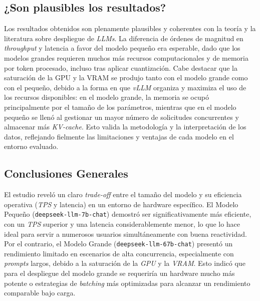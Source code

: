 \subsection*{¿Son plausibles los resultados?}
Los resultados obtenidos son plenamente plausibles y coherentes con la teoría y la literatura sobre despliegue de \textit{LLMs}. La diferencia de órdenes de magnitud en \textit{throughput} y latencia a favor del modelo pequeño era esperable, dado que los modelos grandes requieren muchos más recursos computacionales y de memoria por token procesado, incluso tras aplicar cuantización. Cabe destacar que la saturación de la GPU y la VRAM se produjo tanto con el modelo grande como con el pequeño, debido a la forma en que \textit{vLLM} organiza y maximiza el uso de los recursos disponibles: en el modelo grande, la memoria se ocupó principalmente por el tamaño de los parámetros, mientras que en el modelo pequeño se llenó al gestionar un mayor número de solicitudes concurrentes y almacenar más \textit{KV-cache}. Esto valida la metodología y la interpretación de los datos, reflejando fielmente las limitaciones y ventajas de cada modelo en el entorno evaluado.

\subsection*{Conclusiones Generales}
El estudio reveló un claro \textit{trade-off} entre el tamaño del modelo y su eficiencia operativa (\textit{TPS} y latencia) en un entorno de hardware específico. El Modelo Pequeño (\texttt{deepseek-llm-7b-chat}) demostró ser significativamente más eficiente, con un \textit{TPS} superior y una latencia considerablemente menor, lo que lo hace ideal para servir a numerosos usuarios simultáneamente con buena reactividad. Por el contrario, el Modelo Grande (\texttt{deepseek-llm-67b-chat}) presentó un rendimiento limitado en escenarios de alta concurrencia, especialmente con \textit{prompts} largos, debido a la saturación de la \textit{GPU} y la \textit{VRAM}. Esto indicó que para el despliegue del modelo grande se requeriría un hardware mucho más potente o estrategias de \textit{batching} más optimizadas para alcanzar un rendimiento comparable bajo carga.

